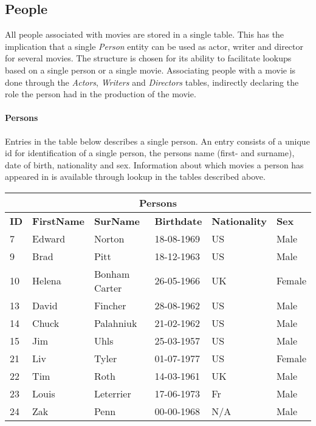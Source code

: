 \subsection{People}
All people associated with movies are stored in a single table.
This has the implication that a single \textit{Person} entity can be used as actor, writer and director for several movies.
The structure is chosen for its ability to facilitate lookups based on a single person or a single movie.
Associating people with a movie is done through the \textit{Actors}, \textit{Writers} and \textit{Directors} tables, indirectly declaring the role the person had in the production of the movie.

\paragraph{Persons}
Entries in the table below describes a single person.
An entry consists of a unique id for identification of a single person, the persons name (first- and surname), date of birth, nationality and sex.
Information about which movies a person has appeared in is available through lookup in the tables described above.

\begin{center}
\begin{tabular}{|l|l|l|l|l|l|}
\hline
\multicolumn{6}{|c|}{Persons} \\ \hline \hline
\textbf{ID} & \textbf{FirstName} & \textbf{SurName} & \textbf{Birthdate} & \textbf{Nationality} & \textbf{Sex} \\ \hline \hline
7 & Edward & Norton & 18-08-1969 & US & Male \\ \hline
9 & Brad & Pitt & 18-12-1963 & US & Male \\ \hline
10 & Helena & Bonham Carter & 26-05-1966 & UK & Female \\ \hline
13 & David & Fincher & 28-08-1962 & US & Male \\ \hline
14 & Chuck & Palahniuk & 21-02-1962 & US & Male \\ \hline
15 & Jim & Uhls & 25-03-1957 & US & Male \\ \hline
21 & Liv & Tyler & 01-07-1977 & US & Female \\ \hline
22 & Tim & Roth & 14-03-1961 & UK & Male \\ \hline
23 & Louis & Leterrier & 17-06-1973 & Fr & Male \\ \hline
24 & Zak & Penn & 00-00-1968 & N/A & Male \\ \hline
\end{tabular}
\end{center}

